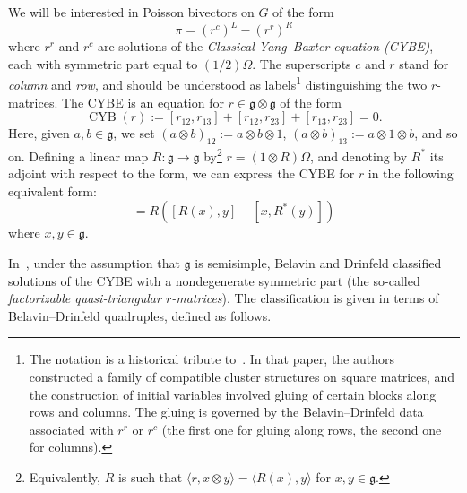 \documentclass[11pt]{article}
\DeclareMathOperator{\CYB}{CYB}
\theoremstyle{definition}\newtheorem{definition}[theorem]{Definition}
\theoremstyle{definition}\newtheorem{remark}[theorem]{Remark}
\theoremstyle{remark}
\numberwithin{equation}{section}
\begin{document}
We will be interested in Poisson bivectors on $G$ of the form
\begin{equation}\label{eq:biv}
    \pi = (r^c)^L - (r^r)^R
\end{equation}
where $r^r$ and $r^c$ are solutions of the \emph{Classical Yang--Baxter equation (CYBE)}, each with symmetric part equal to $(1/2)\Omega$. The superscripts $c$ and $r$ stand for \emph{column} and \emph{row}, and should be understood as labels\footnote{The notation is a historical tribute to~\cite{gsv-plethora}. In that paper, the authors constructed a family of compatible cluster structures on square matrices, and the construction of initial variables involved gluing of certain blocks along rows and columns. The gluing is governed by the Belavin--Drinfeld data associated with $r^r$ or $r^c$ (the first one for gluing along rows, the second one for columns). } distinguishing the two $r$-matrices. The CYBE is an equation for $r \in \mathfrak{g}\otimes \mathfrak{g}$ of the form
\begin{equation*}
    \CYB(r) := [r_{12},r_{13}] + [r_{12},r_{23}] + [r_{13},r_{23}] = 0.
\end{equation*}
Here, given $a,b \in \mathfrak{g}$, we set $(a\otimes b)_{12} := a\otimes b \otimes 1$, $(a\otimes b)_{13}:= a \otimes 1 \otimes b$, and so on. Defining a linear map $R:\mathfrak{g}\rightarrow \mathfrak{g}$ by\footnote{Equivalently, $R$ is such that $\langle r, x \otimes y \rangle = \langle R(x),y \rangle$ for $x, y \in \mathfrak{g}$.} $r=(1\otimes R)\Omega$, and denoting by $R^*$ its adjoint with respect to the form, we can express the CYBE for $r$ in the following equivalent form:
\begin{equation*}
    [R(x),R(y)] = R([R(x),y] - [x,R^*(y)])
\end{equation*}
where $x,y \in \mathfrak{g}$.

In~\cite{bd}, under the assumption that $\mathfrak{g}$ is semisimple, Belavin and Drinfeld classified solutions of the CYBE with a nondegenerate symmetric part (the so-called \emph{factorizable quasi-triangular $r$-matrices}). The classification is given in terms of Belavin--Drinfeld quadruples, defined as follows.
\end{document}
